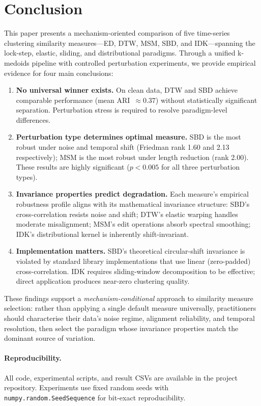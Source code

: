 \section{Conclusion}\label{sec:conclusion}

This paper presents a mechanism-oriented comparison of five time-series clustering similarity measures---ED, DTW, MSM, SBD, and IDK---spanning the lock-step, elastic, sliding, and distributional paradigms.
Through a unified k-medoids pipeline with controlled perturbation experiments, we provide empirical evidence for four main conclusions:

\begin{enumerate}
    \item \textbf{No universal winner exists.} On clean data, DTW and SBD achieve comparable performance (mean ARI~$\approx 0.37$) without statistically significant separation. Perturbation stress is required to resolve paradigm-level differences.

    \item \textbf{Perturbation type determines optimal measure.} SBD is the most robust under noise and temporal shift (Friedman rank 1.60 and 2.13 respectively); MSM is the most robust under length reduction (rank 2.00). These results are highly significant ($p < 0.005$ for all three perturbation types).

    \item \textbf{Invariance properties predict degradation.} Each measure's empirical robustness profile aligns with its mathematical invariance structure: SBD's cross-correlation resists noise and shift; DTW's elastic warping handles moderate misalignment; MSM's edit operations absorb spectral smoothing; IDK's distributional kernel is inherently shift-invariant.

    \item \textbf{Implementation matters.} SBD's theoretical circular-shift invariance is violated by standard library implementations that use linear (zero-padded) cross-correlation. IDK requires sliding-window decomposition to be effective; direct application produces near-zero clustering quality.
\end{enumerate}

These findings support a \emph{mechanism-conditional} approach to similarity measure selection: rather than applying a single default measure universally, practitioners should characterise their data's noise regime, alignment reliability, and temporal resolution, then select the paradigm whose invariance properties match the dominant source of variation.

\paragraph{Reproducibility.}
All code, experimental scripts, and result CSVs are available in the project repository.
Experiments use fixed random seeds with \texttt{numpy.random.SeedSequence} for bit-exact reproducibility.
